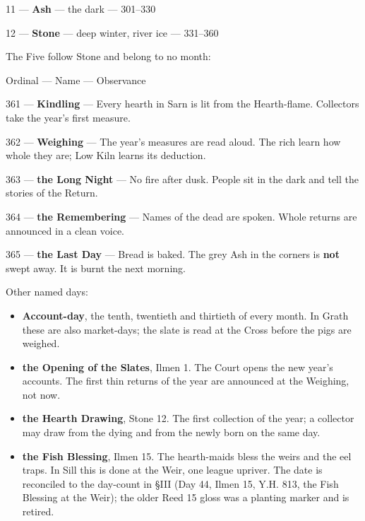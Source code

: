 \documentclass{design/chronicle}
\begin{document}
11 — \textbf{Ash} — the dark — 301–330\par

12 — \textbf{Stone} — deep winter, river ice — 331–360\par

The Five follow Stone and belong to no month:

Ordinal — Name — Observance\par

361 — \textbf{Kindling} — Every hearth in Sarn is lit from the Hearth-flame. Collectors take the year’s first measure.\par

362 — \textbf{Weighing} — The year’s measures are read aloud. The rich learn how whole they are; Low Kiln learns its deduction.\par

363 — \textbf{the Long Night} — No fire after dusk. People sit in the dark and tell the stories of the Return.\par

364 — \textbf{the Remembering} — Names of the dead are spoken. Whole returns are announced in a clean voice.\par

365 — \textbf{the Last Day} — Bread is baked. The grey Ash in the corners is \textbf{not} swept away. It is burnt the next morning.\par

Other named days:

\begin{itemize}[leftmargin=1.4em,itemsep=1pt,topsep=3pt,parsep=0pt]

\item \textbf{Account-day}, the tenth, twentieth and thirtieth of every month. In Grath these are also market-days; the slate is read at the Cross before the pigs are weighed.

\item \textbf{the Opening of the Slates}, Ilmen 1. The Court opens the new year’s accounts. The first thin returns of the year are announced at the Weighing, not now.

\item \textbf{the Hearth Drawing}, Stone 12. The first collection of the year; a collector may draw from the dying and from the newly born on the same day.

\item \textbf{the Fish Blessing}, Ilmen 15. The hearth-maids bless the weirs and the eel traps. In Sill this is done at the Weir, one league upriver. The date is reconciled to the day-count in §III (Day 44, Ilmen 15, Y.H. 813, the Fish Blessing at the Weir); the older Reed 15 gloss was a planting marker and is retired.

\end{itemize}
\end{document}
